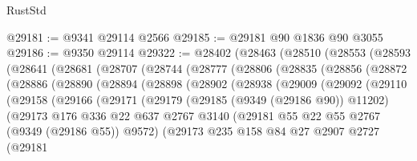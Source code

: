 \begin{lexlean}{RustStd}
\begin{coremodule}
{\begin{coremodule}
{{{{{{{{{{{{{{{{{{{{{{{{{{{{{{{{{{{{{{{@29181 := @9341 @29114 @2566
@29185 := @29181 @90 @1836 @90 @3055
@29186 := @9350 @29114
@29322 := @28402
    (@28463
      (@28510
        (@28553
          (@28593
            (@28641
              (@28681
                (@28707
                  (@28744
                    (@28777
                      (@28806
                        (@28835
                          (@28856
                            (@28872
                              (@28886
                                (@28890
                                  (@28894
                                    (@28898
                                      (@28902
                                        (@28938
                                          (@29009
                                            (@29092
                                              (@29110
                                                (@29158
                                                  (@29166
                                                    (@29171
                                                      (@29179
                                                        (@29185 (@9349 (@29186 @90)) @11202)
                                                        (@29173
                                                          @176
                                                          @336
                                                          @22
                                                          @637
                                                          @2767
                                                          @3140
                                                          (@29181
                                                            @55
                                                            @22
                                                            @55
                                                            @2767
                                                            (@9349 (@29186 @55))
                                                            @9572)
                                                          (@29173
                                                            @235
                                                            @158
                                                            @84
                                                            @27
                                                            @2907
                                                            @2727
                                                            (@29181
}}}}}}}}}}}}}}}}}}}}}}}}}}}}}}}}}}}}}}}
\end{coremodule}}
\end{coremodule}
\end{lexlean}

